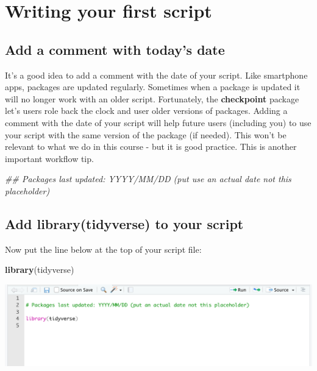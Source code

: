\documentclass[
]{krantz}
\makeatletter
\newenvironment{Shaded}{\begin{snugshade}}{\end{snugshade}}
\newcommand{\CommentTok}[1]{\textcolor[rgb]{0.37,0.37,0.37}{\textit{#1}}}
\newcommand{\KeywordTok}[1]{\textcolor[rgb]{0.27,0.27,0.27}{\textbf{#1}}}
\newcommand{\NormalTok}[1]{#1}
\newenvironment{kframe}{%
\medskip{}
\setlength{\fboxsep}{.8em}
 \def\at@end@of@kframe{}%
 \ifinner\ifhmode%
  \def\at@end@of@kframe{\end{minipage}}%
  \begin{minipage}{\columnwidth}%
 \fi\fi%
 \def\FrameCommand##1{\hskip\@totalleftmargin \hskip-\fboxsep
 \colorbox{shadecolor}{##1}\hskip-\fboxsep
     \hskip-\linewidth \hskip-\@totalleftmargin \hskip\columnwidth}%
 \MakeFramed {\advance\hsize-\width
   \@totalleftmargin\z@ \linewidth\hsize
   \@setminipage}}%
 {\par\unskip\endMakeFramed%
 \at@end@of@kframe}
\renewenvironment{Shaded}{\begin{kframe}}{\end{kframe}}
\makeatother
\begin{document}
\hypertarget{writing-your-first-script}{%
\section{Writing your first script}\label{writing-your-first-script}}

\hypertarget{add-a-comment-with-todays-date}{%
\subsection{Add a comment with today's date}\label{add-a-comment-with-todays-date}}

It's a good idea to add a comment with the date of your script. Like smartphone apps, packages are updated regularly. Sometimes when a package is updated it will no longer work with an older script. Fortunately, the \textbf{checkpoint} package let's users role back the clock and user older versions of packages. Adding a comment with the date of your script will help future users (including you) to use your script with the same version of the package (if needed). This won't be relevant to what we do in this course - but it is good practice. This is another important workflow tip.

\begin{Shaded}
\begin{Highlighting}[]
\CommentTok{## Packages last updated: YYYY/MM/DD (put use an actual date not this placeholder)}
\end{Highlighting}
\end{Shaded}

\hypertarget{add-librarytidyverse-to-your-script}{%
\subsection{Add library(tidyverse) to your script}\label{add-librarytidyverse-to-your-script}}

Now put the line below at the top of your script file:

\begin{Shaded}
\begin{Highlighting}[]
\KeywordTok{library}\NormalTok{(tidyverse)}
\end{Highlighting}
\end{Shaded}

\includegraphics[width=0.5\linewidth,height=0.5\textheight]{first_time/images/script_tidyverse}
\end{document}
